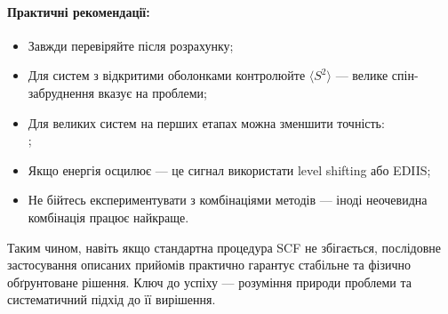 \paragraph{Практичні рекомендації:}
\begin{itemize}
  \item Завжди перевіряйте  після розрахунку;
  \item Для систем з відкритими оболонками контролюйте $\langle S^2 \rangle$ --- велике спін-забруднення вказує на проблеми;
  \item Для великих систем на перших етапах можна зменшити точність:\\ ;
  \item Якщо енергія осцилює --- це сигнал використати level shifting або EDIIS;
  \item Не бійтесь експериментувати з комбінаціями методів --- іноді неочевидна комбінація працює найкраще.
\end{itemize}

\noindent Таким чином, навіть якщо стандартна процедура SCF не збігається, послідовне застосування описаних прийомів практично гарантує стабільне та фізично обґрунтоване рішення. Ключ до успіху --- розуміння природи проблеми та систематичний підхід до її вирішення.